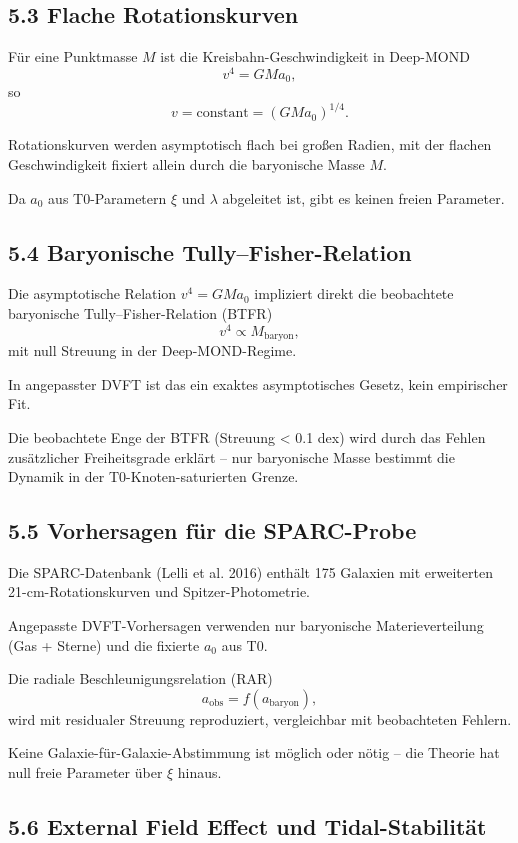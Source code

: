 \documentclass[12pt,a4paper]{article}
\begin{document}
	\subsection{5.3 Flache Rotationskurven}
	
	Für eine Punktmasse $M$ ist die Kreisbahn-Geschwindigkeit in Deep-MOND
	\[
	v^4 = G M a_0,
	\]
	so
	\[
	v = \text{constant} = (G M a_0)^{1/4}.
	\]
	
	Rotationskurven werden asymptotisch flach bei großen Radien, mit der flachen Geschwindigkeit fixiert allein durch die baryonische Masse $M$.
	
	Da $a_0$ aus T0-Parametern $\xi$ und $\lambda$ abgeleitet ist, gibt es keinen freien Parameter.
	
	\subsection{5.4 Baryonische Tully–Fisher-Relation}
	
	Die asymptotische Relation $v^4 = G M a_0$ impliziert direkt die beobachtete baryonische Tully–Fisher-Relation (BTFR)
	\[
	v^4 \propto M_{\text{baryon}},
	\]
	mit null Streuung in der Deep-MOND-Regime.
	
	In angepasster DVFT ist das ein exaktes asymptotisches Gesetz, kein empirischer Fit.
	
	Die beobachtete Enge der BTFR (Streuung < 0.1 dex) wird durch das Fehlen zusätzlicher Freiheitsgrade erklärt – nur baryonische Masse bestimmt die Dynamik in der T0-Knoten-saturierten Grenze.
	
	\subsection{5.5 Vorhersagen für die SPARC-Probe}
	
	Die SPARC-Datenbank (Lelli et al. 2016) enthält 175 Galaxien mit erweiterten 21-cm-Rotationskurven und Spitzer-Photometrie.
	
	Angepasste DVFT-Vorhersagen verwenden nur baryonische Materieverteilung (Gas + Sterne) und die fixierte $a_0$ aus T0.
	
	Die radiale Beschleunigungsrelation (RAR)
	\[
	a_{\text{obs}} = f(a_{\text{baryon}}),
	\]
	wird mit residualer Streuung reproduziert, vergleichbar mit beobachteten Fehlern.
	
	Keine Galaxie-für-Galaxie-Abstimmung ist möglich oder nötig – die Theorie hat null freie Parameter über $\xi$ hinaus.
	
	\subsection{5.6 External Field Effect und Tidal-Stabilität}
	
\end{document}
